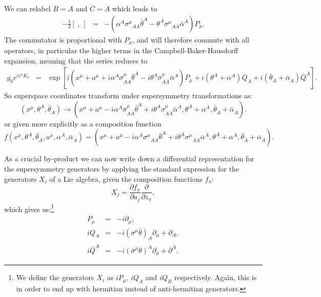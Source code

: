 \documentclass[notes.tex]{subfiles}
\begin{document}
We can relabel $B = A$ and $\dot{C} = \dot{A}$ which leads to 
\begin{eqnarray*}
-\frac{1}{2}[~,~]&=&-(\alpha^A\sigma^\mu{}_{A\dot{A}}\bar{\theta}^{\dot{A}} -\theta^A\sigma^\mu{}_{A\dot{A}}\bar{\alpha}^{\dot{A}})P_\mu.
\end{eqnarray*}
The commutator is proportional with $P_\mu$, and will therefore commute with all operators, in particular the higher terms in the Campbell-Baker-Hausdorff expansion, meaning that the series reduces to
\begin{eqnarray*}
g_0 e^{iz^\pi K_\pi} 
&=& \exp[i(x^\mu + a^\mu+ i\alpha^A\sigma^\mu_{A\dot{A}}\bar{\theta}^{\dot{A}} - i\theta^A\sigma^\mu_{A\dot{A}}\bar{\alpha}^{\dot{A}})P_\mu + i(\theta^A+\alpha^A)Q_A + i(\bar{\theta}_{\dot{A}}+\bar{\alpha}_{\dot{A}})\bar{Q}^{\dot{A}}].
\end{eqnarray*}
So superspace coordinates transform under supersymmetry transformations as:
\begin{equation}
(x^\mu, \theta^A, \bar{\theta}_{\dot{A}}) \to  (x^\mu + a^\mu -i\alpha^A\sigma^\mu_{A\dot{A}}\bar{\theta}^{\dot{A}} + i\theta^A\sigma^\mu_{A\dot{A}}\bar{\alpha}^{\dot{A}}, \theta^A + \alpha^A, \bar{\theta}_{\dot{A}} + \bar{\alpha}_{\dot{A}}).
\end{equation}
or given more explicitly as a composition function
\begin{equation}
f(x^\mu, \theta^A, \bar{\theta}_{\dot{A}},a^\mu, \alpha^A, \bar{\alpha}_{\dot{A}}) =  (x^\mu + a^\mu -i\alpha^A\sigma^\mu{}_{A\dot{A}}\bar{\theta}^{\dot{A}} + i\theta^A\sigma^\mu{}_{A\dot{A}}\bar{\alpha}^{\dot{A}}, \theta^A + \alpha^A, \bar{\theta}_{\dot{A}} + \bar{\alpha}_{\dot{A}}).
\end{equation}

As a crucial by-product we can now write down a differential representation for the supersymmetry generators by applying the standard expression for the generators $X_i$ of a Lie algebra, given the composition functions $f_\pi$:
\[X_j = \frac{\partial f_\pi}{\partial a_j}\frac{\partial}{\partial z_\pi},\]
which gives us:\footnote{We define the generators $X_i$ as $iP_\mu$, $iQ_A$ and $iQ_B$ respectively. Again, this is in order to end up with hermitian instead of anti-hermitian generators.}
\begin{eqnarray}
P_\mu &=& -i\partial_\mu \label{eq:diffrepP},\\
iQ_A &=& -i(\sigma^\mu\bar{\theta})_A\partial_\mu +\partial_A,\\
i\bar{Q}^{\dot{A}} &=& -i(\bar{\sigma}^\mu \theta)^{\dot{A}}\partial_\mu +\partial^{\dot{A}}.
\label{eq:diffrepQbar}
\end{eqnarray}
\end{document}
